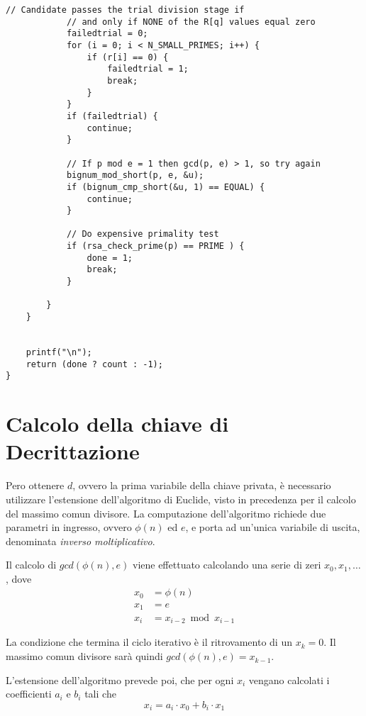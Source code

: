 \begin{lstlisting}[basicstyle=\ttfamily\small, backgroundcolor=\color{bgCode}]
            // Candidate passes the trial division stage if
            // and only if NONE of the R[q] values equal zero
            failedtrial = 0;
            for (i = 0; i < N_SMALL_PRIMES; i++) {
                if (r[i] == 0) {
                    failedtrial = 1;
                    break;
                }
            }
            if (failedtrial) {
                continue;
            }
            
            // If p mod e = 1 then gcd(p, e) > 1, so try again
            bignum_mod_short(p, e, &u);
            if (bignum_cmp_short(&u, 1) == EQUAL) {
                continue;
            }
            
            // Do expensive primality test
            if (rsa_check_prime(p) == PRIME ) {
                done = 1;
                break;
            }
            
        }
    }
    
    
    printf("\n");
    return (done ? count : -1);
}
\end{lstlisting}

%
%
\section{Calcolo della chiave di Decrittazione}
\label{sec:chiaveDecrittazione}
%
%

Pero ottenere $d$, ovvero la prima variabile della chiave privata, è necessario utilizzare l'estensione dell'algoritmo di Euclide, visto in precedenza per il calcolo del massimo comun divisore. La computazione dell'algoritmo richiede due parametri in ingresso, ovvero $\phi(n)$ ed $e$, e porta ad un'unica variabile di uscita, denominata \emph{inverso moltiplicativo}.

Il calcolo di $gcd(\phi(n), e)$ viene effettuato calcolando una serie di zeri $x_0, x_1, \dotsc$, dove
\begin{align*}
	x_0 &= \phi(n) \\
	x_1 &= e \\
	x_i &= x_{i-2} \bmod x_{i-1}
\end{align*}

La condizione che termina il ciclo iterativo è il ritrovamento di un $x_k = 0$. Il massimo comun divisore sarà quindi $gcd(\phi(n), e) = x_{k-1}$.

L'estensione dell'algoritmo prevede poi, che per ogni $x_i$ vengano calcolati i coefficienti $a_i$ e $b_i$ tali che \[ x_i = a_i \cdot x_0 + b_i \cdot x_1 \]

